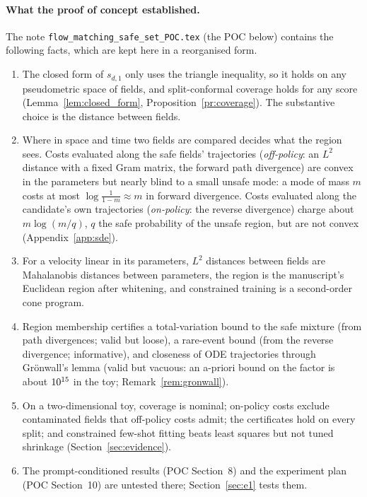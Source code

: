 \documentclass{article}
\theoremstyle{plain}
\theoremstyle{remark}
\begin{document}
\paragraph{What the proof of concept established.}
The note \texttt{flow\_matching\_safe\_set\_POC.tex} (the POC below) contains the following
facts, which are kept here in a reorganised form.
\begin{enumerate}
\item The closed form of $s_{d,1}$ only uses the triangle inequality, so it holds on any
pseudometric space of fields, and split-conformal coverage holds for any score
(Lemma~\ref{lem:closed_form}, Proposition~\ref{pr:coverage}). The substantive choice is the
distance between fields.
\item Where in space and time two fields are compared decides what the region sees. Costs
evaluated along the safe fields' trajectories (\emph{off-policy}: an $L^2$ distance with a fixed
Gram matrix, the forward path divergence) are convex in the parameters but nearly blind to a
small unsafe mode: a mode of mass $m$ costs at most $\log\frac{1}{1-m}\approx m$ in forward
divergence. Costs evaluated along the candidate's own trajectories (\emph{on-policy}: the
reverse divergence) charge about $m\log(m/q)$, $q$ the safe probability of the unsafe region,
but are not convex (Appendix~\ref{app:sde}).
\item For a velocity linear in its parameters, $L^2$ distances between fields are Mahalanobis
distances between parameters, the region is the manuscript's Euclidean region after
whitening, and constrained training is a second-order cone program.
\item Region membership certifies a total-variation bound to the safe mixture (from path
divergences; valid but loose), a rare-event bound (from the reverse divergence; informative),
and closeness of ODE trajectories through Gr\"onwall's lemma (valid but vacuous: an a-priori bound on
the factor is about $10^{15}$ in the toy; Remark~\ref{rem:gronwall}).
\item On a two-dimensional toy, coverage is nominal; on-policy costs exclude contaminated fields
that off-policy costs admit; the certificates hold on every split; and constrained few-shot
fitting beats least squares but not tuned shrinkage (Section~\ref{sec:evidence}).
\item The prompt-conditioned results (POC Section~8) and the experiment plan (POC Section~10) are untested
there; Section~\ref{sec:e1} tests them.
\end{enumerate}
\end{document}
